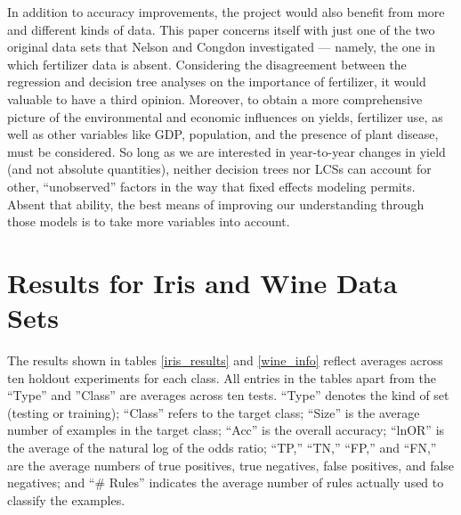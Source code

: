\documentclass[12pt,twoside]{article}
\begin{document}
In addition to accuracy improvements, the project would also benefit from more and different kinds of data. This paper concerns itself with just one of the two original data sets that Nelson and Congdon investigated --- namely, the one in which fertilizer data is absent. Considering the disagreement between the regression and decision tree analyses on the importance of fertilizer, it would valuable to have a third opinion. Moreover, to obtain a more comprehensive picture of the environmental and economic influences on yields, fertilizer use, as well as other variables like GDP, population, and the presence of plant disease, must be considered. So long as we are interested in year-to-year changes in yield (and not absolute quantities), neither decision trees nor LCSs can account for other, ``unobserved'' factors in the way that fixed effects modeling permits. Absent that ability, the best means of improving our understanding through those models is to take more variables into account.


\appendix
\appendixpage
\addappheadtotoc

\section{Results for Iris and Wine Data Sets}

The results shown in tables \ref{iris_results} and \ref{wine_info} reflect averages across ten holdout experiments for each class. All entries in the tables apart from the ``Type'' and  ''Class'' are averages across ten tests. ``Type'' denotes the kind of set (testing or training); ``Class'' refers to the target class; ``Size'' is the average number of examples in the target class; ``Acc'' is the overall accuracy; ``lnOR'' is the average of the natural log of the odds ratio; ``TP,'' ``TN,'' ``FP,'' and ``FN,'' are the average numbers of true positives, true negatives, false positives, and false negatives; and ``\# Rules'' indicates the average number of rules actually used to classify the examples.
\end{document}
